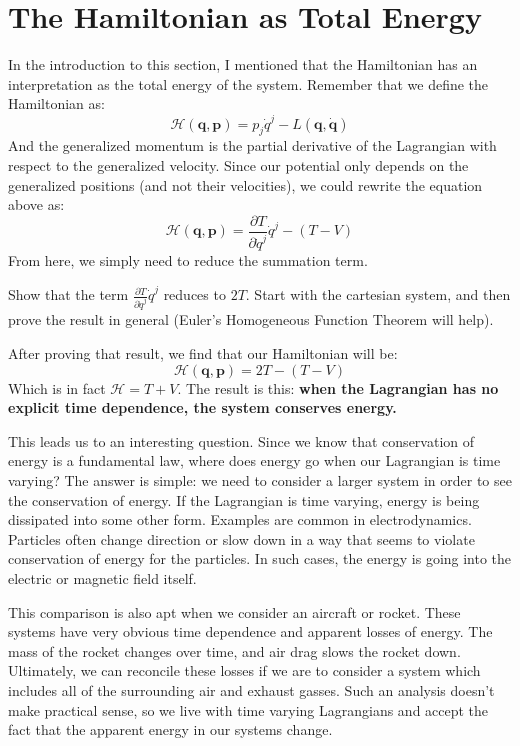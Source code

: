 \section{The Hamiltonian as Total Energy}
In the introduction to this section, I mentioned that the \gls{Hamiltonian} has an interpretation as the total energy of the system. Remember that we define the \gls{Hamiltonian} as:
$$\mathcal{H}(\bm{q},\bm{p})=p_j\dot{q}^j-L(\bm{q},\bm{\dot{q}})$$
And the generalized momentum is the partial derivative of the \gls{Lagrangian} with respect to the generalized velocity. Since our potential only depends on the generalized positions (and not their velocities), we could rewrite the equation above as:
$$\mathcal{H}(\bm{q},\bm{p})=\frac{\partial T}{\partial \dot{q}^j}\dot{q}^j-(T-V)$$
From here, we simply need to reduce the summation term.
\begin{exercise}
Show that the term $\frac{\partial T}{\partial \dot{q}^j}\dot{q}^j$ reduces to $2T$. Start with the cartesian system, and then prove the result in general (Euler’s Homogeneous Function Theorem will help).
\end{exercise}
After proving that result, we find that our \gls{Hamiltonian} will be:
$$\mathcal{H}(\bm{q},\bm{p})=2T-(T-V)$$
Which is in fact $\mathcal{H}=T+V$. The result is this: \textbf{when the \gls{Lagrangian} has no explicit time dependence, the system conserves energy.}

This leads us to an interesting question. Since we know that conservation of energy is a fundamental law, where does energy go when our \gls{Lagrangian} is time varying? The answer is simple: we need to consider a larger system in order to see the conservation of energy. If the \gls{Lagrangian} is time varying, energy is being dissipated into some other form. Examples are common in electrodynamics. Particles often change direction or slow down in a way that seems to violate conservation of energy for the particles. In such cases, the energy is going into the electric or magnetic field itself. 

This comparison is also apt when we consider an aircraft or rocket. These systems have very obvious time dependence and apparent losses of energy. The mass of the rocket changes over time, and air drag slows the rocket down. Ultimately, we can reconcile these losses if we are to consider a system which includes all of the surrounding air and exhaust gasses. Such an analysis doesn't make practical sense, so we live with time varying \glspl{Lagrangian} and accept the fact that the apparent energy in our systems change. 

